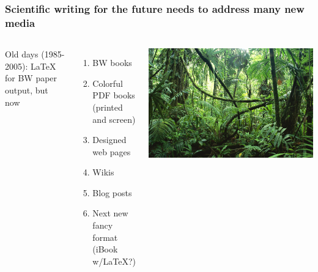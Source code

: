 \documentclass{beamer}
\begin{document}
\begin{frame}
\frametitle{Scientific writing for the future needs to address many new media}


\begin{columns}
Old days (1985-2005): {\LaTeX} for BW paper output, but now

\begin{enumerate}
  \item BW books

  \item Colorful PDF books (printed and screen)

  \item Designed web pages

  \item Wikis

  \item Blog posts

  \item Next new fancy format (iBook w/LaTeX?)
\end{enumerate}

\noindent

\vspace{6mm}

\centerline{\includegraphics[width=0.9\linewidth]{testfigs/jungle_with_mess.jpg}}

\vspace{6mm}


\end{columns}
\end{frame}
\end{document}
